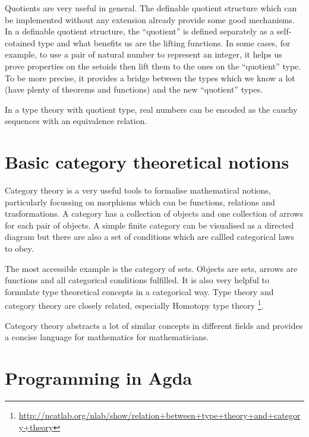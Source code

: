 
Quotients are very useful in general. The definable quotient structure
which can be implemented without any extension already provide some
good mechanisms. In a definable quotient structure, the ``quotient''
is defined separately as a self-cotained type and what benefits us are
the lifting functions. In some cases, for example, to use a pair of
natural number to represent an integer, it helps us prove properties
on the setoids then lift them to the ones on the ``quotient'' type. To
be more precise, it provides a bridge between the types which we know
a lot (have plenty of theorems and functions) and the new
``quotient'' types.


In a type theory with quotient type, real numbers can be encoded as
the cauchy sequences with an equivalence relation.


\section{Basic category theoretical notions}

Category theory is a very useful tools to formalise mathematical notions, particularly focussing on morphisms which can be functions, relations and trasformations.
A category has a collection of objects and one collection of arrows for each pair of objects. A simple finite category can be visualised as a directed diagram but there are also a set of conditions which are callled categorical laws to obey. 

The most accessible example is the category of sets. Objects are sets, arrows are functions and all categorical conditions fulfilled. It is also very helpful to formulate type theoretical concepts in a categorical way. Type theory and category theory are closely related, especially Homotopy type theory \footnote{\url{http://ncatlab.org/nlab/show/relation+between+type+theory+and+category+theory}}.

Category theory abstracts a lot of similar concepts in different fields and provides a concise language for mathematics for mathematicians.


\section{Programming in Agda}


